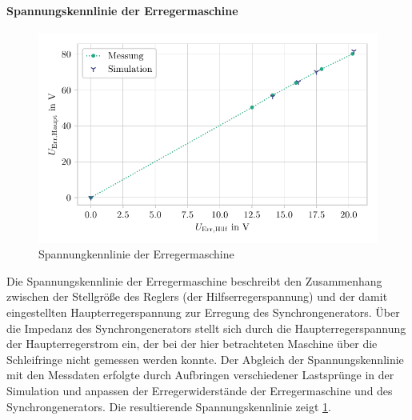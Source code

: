 \paragraph{Spannungskennlinie der Erregermaschine}
\begin{figure}[h!]
    \centering
    \includegraphics{Bilder/Validierung_Erregermaschine.pdf}
    \caption{Spannungkennlinie der Erregermaschine}
    \label{fig:Validierung-Erregermaschine}
\end{figure}
Die Spannungskennlinie der Erregermaschine beschreibt den Zusammenhang zwischen der Stellgröße des Reglers (der Hilfserregerspannung) und der damit eingestellten Haupterregerspannung zur Erregung des Synchrongenerators. Über die Impedanz des Synchrongenerators stellt sich durch die Haupterregerspannung der Haupterregerstrom ein, der bei der hier betrachteten Maschine über die Schleifringe nicht gemessen werden konnte. Der Abgleich der Spannungskennlinie mit den Messdaten erfolgte durch Aufbringen verschiedener Lastsprünge in der Simulation und anpassen der Erregerwiderstände der Erregermaschine und des Synchrongenerators. Die resultierende Spannungskennlinie zeigt \cref{fig:Validierung-Erregermaschine}.

